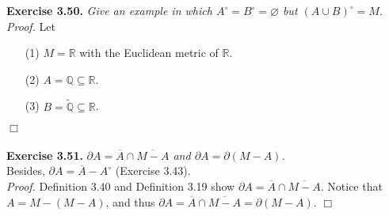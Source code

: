 \documentclass{article}
\begin{document}



\textbf{Exercise 3.50.}
\emph{Give an example in which $A^{\circ} = B^{\circ} = \varnothing$ but
$(A \cup B)^{\circ} = M$. } \\

\emph{Proof.}
Let
\begin{enumerate}
\item[(1)]
$M = \mathbb{R}$ with the Euclidean metric of $\mathbb{R}$.
\item[(2)]
$A = \mathbb{Q} \subseteq \mathbb{R}$.
\item[(3)]
$B = \widetilde{\mathbb{Q}} \subseteq \mathbb{R}$.
\end{enumerate}
$\Box$ \\\\






\textbf{Exercise 3.51.}
\emph{$\partial A = \overline{A} \cap \overline{M-A}$ and
$\partial A = \partial(M - A)$.} \\

Besides, $\partial A = \overline{A} - A^{\circ}$ (Exercise 3.43). \\

\emph{Proof.}
Definition 3.40 and Definition 3.19 show $\partial A = \overline{A} \cap \overline{M-A}$.
Notice that $A = M - (M-A)$, and thus
$\partial A = \overline{A} \cap \overline{M-A} = \partial(M - A)$.
$\Box$ \\\\



\end{document}
